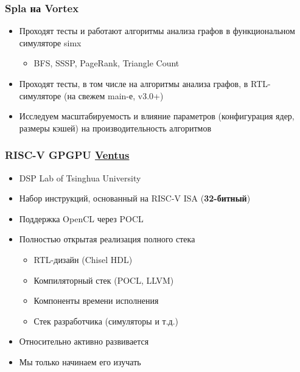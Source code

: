 \documentclass[xcolor=table,aspectratio=169]{beamer}
\begin{document}
\begin{frame}[fragile]
  \frametitle{Spla на Vortex}
  \begin{itemize}
    \item[\faCheck] Проходят тесты и работают алгоритмы анализа графов в функциональном симуляторе simx
    \begin{itemize}
      \item BFS, SSSP, PageRank, Triangle Count
    \end{itemize}      
    \item[\faCheck] Проходят тесты, в том числе на алгоритмы анализа графов, в RTL-симуляторе (на свежем main-е, v3.0+)
    \item[\faGears] Исследуем масштабируемость и влияние параметров (конфигурация ядер, размеры кэшей) на производительность алгоритмов
\end{itemize}
\end{frame}

\begin{frame}[fragile]
  \frametitle{RISC-V GPGPU \href{https://github.com/THU-DSP-LAB/ventus-gpgpu}{Ventus}}
  \begin{itemize}
    \item DSP Lab of Tsinghua University 
    \item Набор инструкций, основанный на RISC-V ISA (\textbf{32-битный})
    \item Поддержка OpenCL через POCL 
    \item Полностью открытая реализация полного стека
    \begin{itemize}
      \item RTL-дизайн (Chisel HDL)
      \item Компиляторный стек (POCL, LLVM)
      \item Компоненты времени исполнения
      \item Стек разработчика (симуляторы и т.д.)
    \end{itemize}    
    \item Относительно активно развивается
    \pause
    \item[\faGears] Мы только начинаем его изучать
  \end{itemize}
\end{frame}
\end{document}

